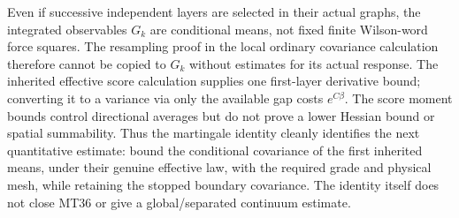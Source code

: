 \documentclass[11pt]{article}
\begin{document}
Even if successive independent layers are selected in their actual graphs, the integrated
observables $G_k$ are conditional means, not fixed finite Wilson-word force squares.
The resampling proof in the local ordinary covariance calculation therefore cannot be copied to $G_k$ without estimates for
its actual response. The inherited effective score calculation supplies one first-layer derivative bound; converting it to a
variance via only the available gap costs $e^{C\beta}$. The score moment bounds control
directional averages but do not prove a lower Hessian bound or spatial summability.
Thus the martingale identity cleanly identifies the next quantitative estimate: bound the
conditional covariance of the first inherited means, under their genuine effective law,
with the required grade and physical mesh, while retaining the stopped boundary covariance.
The identity itself does not close MT36 or give a global/separated continuum estimate.
\end{document}

